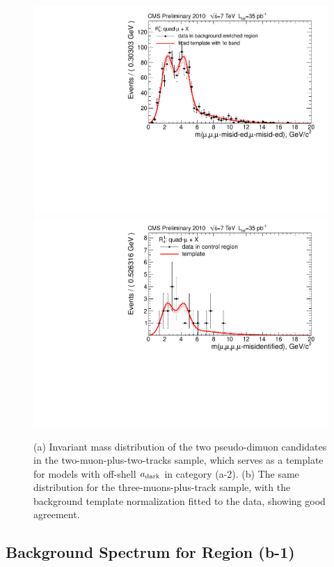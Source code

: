 \begin{figure}[tbh]
\includegraphics[width=0.5\linewidth]{PLOTS/template__bkg_model_a2_inv__m_inv.pdf}
\includegraphics[width=0.5\linewidth]{PLOTS/template_control__bkg_model_a2_inv__m_inv.pdf}
\caption{(a) Invariant mass distribution of the two pseudo-dimuon candidates in the two-muon-plus-two-tracks sample, which serves as a template for models with off-shell $a_{\mbox{\scriptsize dark}}$ in category (a-2).  (b) The same distribution for the three-muons-plus-track sample, with the background template normalization fitted to the data, showing good agreement.  \label{fig:quadmuon_background_control}}
\end{figure}

\subsection{Background Spectrum for Region (b-1)}
\label{sec:background_spectrum_for_b_1}

